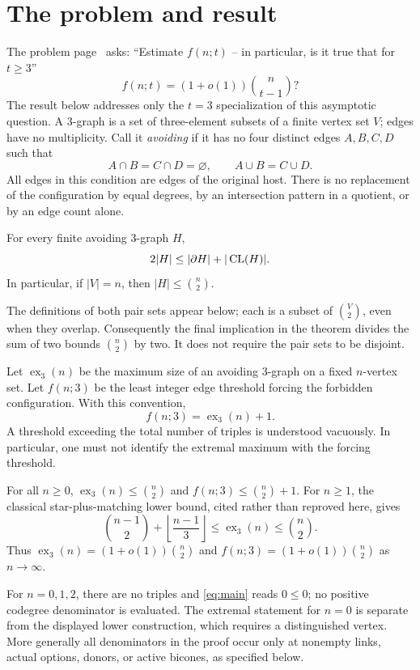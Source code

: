 \section{The problem and result}
The problem page~\cite{erdos} asks: ``Estimate $f(n;t)$ -- in particular, is it true that for $t\ge3$''
\[
 f(n;t)=(1+o(1))\binom{n}{t-1}?
\]
The result below addresses only the $t=3$ specialization of this asymptotic question.
A $3$-graph is a set of three-element subsets of a finite vertex set $V$; edges have no multiplicity. Call it \emph{avoiding} if it has no four distinct edges $A,B,C,D$ such that
\[
 A\cap B=C\cap D=\varnothing,\qquad A\cup B=C\cup D.
\]
All edges in this condition are edges of the original host. There is no replacement of the configuration by equal degrees, by an intersection pattern in a quotient, or by an edge count alone.

\begin{theorem}\label{thm:main}
For every finite avoiding $3$-graph $H$,
\begin{equation}\label{eq:main}
 2|H|\leq |\partial H|+|\operatorname{CL}(H)|.
\end{equation}
In particular, if $|V|=n$, then $|H|\leq\binom n2$.
\end{theorem}
The definitions of both pair sets appear below; each is a subset of $\binom V2$, even when they overlap. Consequently the final implication in the theorem divides the sum of two bounds $\binom n2$ by two. It does not require the pair sets to be disjoint.

Let $\operatorname{ex}_3(n)$ be the maximum size of an avoiding $3$-graph on a fixed $n$-vertex set. Let $f(n;3)$ be the least integer edge threshold forcing the forbidden configuration. With this convention,
\[
 f(n;3)=\operatorname{ex}_3(n)+1.
\]
A threshold exceeding the total number of triples is understood vacuously. In particular, one must not identify the extremal maximum with the forcing threshold.

\begin{corollary}
For all $n\geq0$, $\operatorname{ex}_3(n)\leq\binom n2$ and $f(n;3)\leq\binom n2+1$. For $n\geq1$, the classical star-plus-matching lower bound, cited rather than reproved here, gives
\[
 \binom{n-1}{2}+\left\lfloor\frac{n-1}{3}\right\rfloor
 \leq\operatorname{ex}_3(n)\leq\binom n2.
\]
Thus $\operatorname{ex}_3(n)=(1+o(1))\binom n2$ and $f(n;3)=(1+o(1))\binom n2$ as $n\to\infty$.
\end{corollary}
For $n=0,1,2$, there are no triples and \eqref{eq:main} reads $0\leq0$; no positive codegree denominator is evaluated. The extremal statement for $n=0$ is separate from the displayed lower construction, which requires a distinguished vertex. More generally all denominators in the proof occur only at nonempty links, actual options, donors, or active bicones, as specified below.

